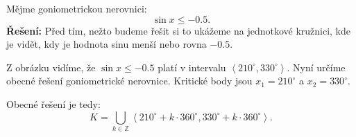 \documentclass[12pt,a4paper]{article}
\begin{document}
\begin{examplebox}
    Mějme goniometrickou nerovnici:
    \[
    \sin x \le -0.5.
    \]
    \medskip
    \textbf{Řešení:}
    Před tím, nežto budeme řešit si to ukážeme na jednotkové kružnici, kde je vidět, kdy je hodnota sinu menší nebo rovna $-0.5$.

    \begin{center}
    \end{center}

    Z obrázku vidíme, že $\sin x \le -0.5$ platí v intervalu $\left\langle 210^\circ, 330^\circ\right\rangle$.
    \medskip
    Nyní určíme obecné řešení goniometrické nerovnice.
    Kritické body jsou $x_1 = 210^\circ$ a $x_2 = 330^\circ$.
    
    Obecné řešení je tedy:
    \[
    K = \bigcup_{k \in \mathbb{Z}} \left\langle 210^\circ + k \cdot 360^\circ, 330^\circ + k \cdot 360^\circ \right\rangle.
    \]
\end{examplebox}






\end{document}
